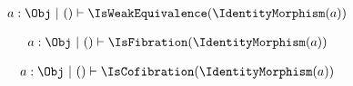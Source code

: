 

\begin{sequent}
\begin{align*}
a: \Obj ~|~ () \vdash \IsWeakEquivalence( \IdentityMorphism( a ) ) 
\end{align*}
\end{sequent}

\begin{sequent}
\begin{align*}
a: \Obj ~|~ () \vdash \IsFibration( \IdentityMorphism( a ) ) 
\end{align*}
\end{sequent}

\begin{sequent}
\begin{align*}
a: \Obj ~|~ () \vdash \IsCofibration( \IdentityMorphism( a ) ) 
\end{align*}
\end{sequent}

